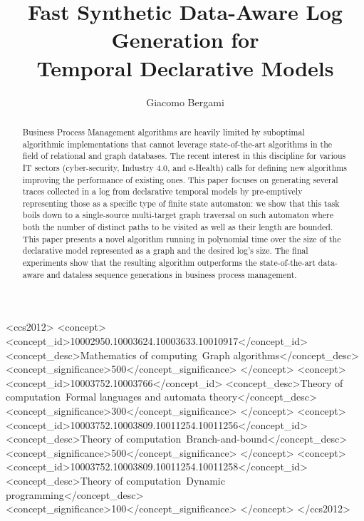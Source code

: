 \documentclass[sigconf]{acmart}
\begin{document}
	\title[Fast Synthetic Data-Aware Log Generation for Temporal Declarative Models]{Fast Synthetic Data-Aware Log Generation for\\ Temporal Declarative Models}

\author{Giacomo Bergami}


\begin{abstract}
Business Process Management algorithms are heavily limited by suboptimal algorithmic implementations that cannot leverage state-of-the-art algorithms in the field of relational and graph databases. The recent interest in this discipline for various IT sectors (cyber-security, Industry 4.0, and e-Health) calls for defining new algorithms  improving the performance of existing ones. This paper focuses on generating several traces collected in a log from declarative temporal models by pre-emptively representing those as a specific type of finite state automaton: we show that this task boils down to a single-source multi-target graph traversal on such automaton where both the number of distinct paths to be visited as well as their length are bounded. This paper presents a novel algorithm running in polynomial time over the size of the declarative model represented as a graph and the desired log's size. The final experiments show that the resulting algorithm outperforms the state-of-the-art data-aware and dataless sequence generations in business process management.
\end{abstract}


\begin{CCSXML}
<ccs2012>
   <concept>
       <concept_id>10002950.10003624.10003633.10010917</concept_id>
       <concept_desc>Mathematics of computing~Graph algorithms</concept_desc>
       <concept_significance>500</concept_significance>
       </concept>
   <concept>
       <concept_id>10003752.10003766</concept_id>
       <concept_desc>Theory of computation~Formal languages and automata theory</concept_desc>
       <concept_significance>300</concept_significance>
       </concept>
   <concept>
       <concept_id>10003752.10003809.10011254.10011256</concept_id>
       <concept_desc>Theory of computation~Branch-and-bound</concept_desc>
       <concept_significance>500</concept_significance>
       </concept>
   <concept>
       <concept_id>10003752.10003809.10011254.10011258</concept_id>
       <concept_desc>Theory of computation~Dynamic programming</concept_desc>
       <concept_significance>100</concept_significance>
       </concept>
 </ccs2012>
\end{CCSXML}
\end{document}
